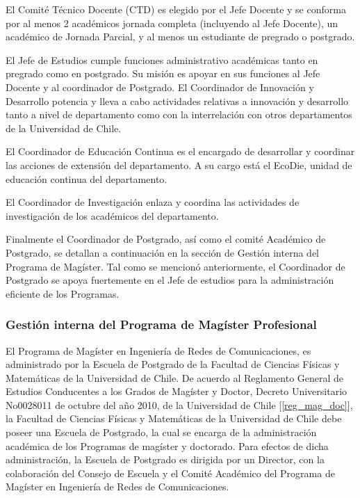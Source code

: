 El Comité Técnico Docente (CTD) es elegido por el Jefe Docente y se conforma por al menos
2 académicos jornada completa (incluyendo al Jefe Docente), un académico de Jornada Parcial, y
al menos un estudiante de pregrado o postgrado.

El Jefe de Estudios cumple funciones administrativo académicas tanto en pregrado como en
postgrado. Su misión es apoyar en sus funciones al Jefe Docente y al coordinador de Postgrado.
El Coordinador de Innovación y Desarrollo potencia y lleva a cabo actividades relativas
a innovación y desarrollo tanto a nivel de departamento como con la interrelación con otros
departamentos de la Universidad de Chile.

El Coordinador de Educación Continua es el encargado de desarrollar y coordinar las
acciones de extensión del departamento. A su cargo está el EcoDie, unidad de educación continua
del departamento.

El Coordinador de Investigación enlaza y coordina las actividades de investigación de los
académicos del departamento.

Finalmente el Coordinador de Postgrado, así como el comité Académico de Postgrado, se
detallan a continuación en la sección de Gestión interna del Programa de Magíster. Tal como se
mencionó anteriormente, el Coordinador de Postgrado se apoya fuertemente en el Jefe de estudios
para la administración eficiente de los Programas.

\subsubsection{Gestión interna del Programa de Magíster Profesional}

El Programa de Magíster en Ingeniería de Redes de Comunicaciones, es administrado por la
Escuela de Postgrado de la Facultad de Ciencias Físicas y Matemáticas de la Universidad de Chile.
De acuerdo al Reglamento General de Estudios Conducentes a los Grados de Magíster y Doctor,
Decreto Universitario No0028011 de octubre del año 2010, de la Universidad de Chile [\ref{reg_mag_doc}], la
Facultad de Ciencias Físicas y Matemáticas de la Universidad de Chile debe poseer una Escuela
de Postgrado, la cual se encarga de la administración académica de los Programas de magíster
y doctorado. Para efectos de dicha administración, la Escuela de Postgrado es dirigida por un
Director, con la colaboración del Consejo de Escuela y el Comité Académico del Programa de Magíster en Ingeniería de Redes de Comunicaciones.


